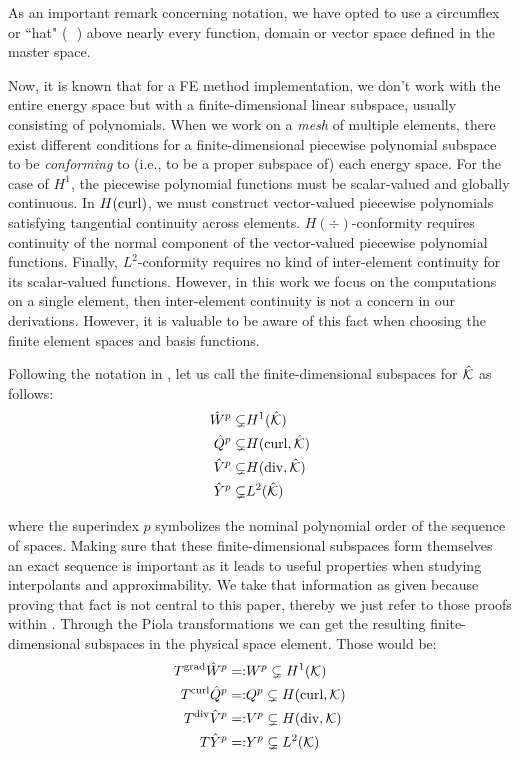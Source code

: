 As an important remark concerning notation, we have opted to use a circumflex or ``hat" ( $\hat{}$ ) above nearly every function, domain or vector space defined in the master space.

Now, it is known that for a FE method implementation, we don't work with the entire energy space but with a finite-dimensional linear subspace, usually consisting of polynomials. 
{\color{blue} When we work on a \emph{mesh} of multiple elements, there exist different conditions for a finite-dimensional piecewise polynomial subspace to be \emph{conforming} to (i.e., to be a proper subspace of) each energy space. For the case of $H^1$, the piecewise polynomial functions must be scalar-valued and globally continuous. In $H(\operatorname{curl})$, we must construct vector-valued piecewise polynomials satisfying tangential continuity across elements. $H(\div)$-conformity requires continuity of the normal component of the vector-valued piecewise polynomial functions. Finally, $L^2$-conformity requires no kind of inter-element continuity for its scalar-valued functions. However, in this work we focus on the computations on a single element, then inter-element continuity is not a concern in our derivations. However, it is valuable to be aware of this fact when choosing the finite element spaces and basis functions.}

Following the notation in \cite{hpbook2,Fuentes2015}, let us call the finite-dimensional subspaces for $\hat{\mathcal{K}}$ as follows:
% 
\begin{align*}
    \hat{W}^p\subsetneq&H^1(\hat{\mathcal{K}}) \\
    \hat{Q}^p\subsetneq&H(\operatorname{curl},\hat{\mathcal{K}}) \\
    \hat{V}^p\subsetneq&H(\operatorname{div},\hat{\mathcal{K}}) \\
    \hat{Y}^p\subsetneq&L^2(\hat{\mathcal{K}})
\end{align*}

\noindent where the superindex $p$ symbolizes the nominal polynomial order of the sequence of spaces. Making sure that these finite-dimensional subspaces form themselves an exact sequence is important as it leads to useful properties when studying interpolants and approximability. We take that information as given because proving that fact is not central to this paper, thereby we just refer to those proofs within \cite{hpbook2}. Through the Piola transformations we can get the resulting finite-dimensional subspaces in the physical space element. Those would be:
% 
\begin{equation}
\begin{aligned}
    T^{\operatorname{grad}}\hat{W}^p=:&W^p\subsetneq H^1(\mathcal{K}) \\
    T^{\operatorname{curl}}\hat{Q}^p=:&Q^p\subsetneq H(\operatorname{curl},\mathcal{K}) \\
    T^{\operatorname{div}}\hat{V}^p=:&V^p\subsetneq H(\operatorname{div},\mathcal{K}) \\
    T\hat{Y}^p=:&Y^p\subsetneq L^2(\mathcal{K})
\end{aligned}
\label{finitedimspaces}
\end{equation}

